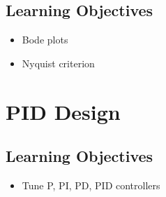 \documentclass[
  letterpaper,
  DIV=11,
  numbers=noendperiod]{scrreprt}
\providecommand{\tightlist}{%
  \setlength{\itemsep}{0pt}\setlength{\parskip}{0pt}}
\begin{document}
\section{Learning Objectives}\label{learning-objectives-3}

\begin{itemize}
\tightlist
\item
  Bode plots
\item
  Nyquist criterion
\end{itemize}


\chapter{PID Design}\label{pid-design}

\section{Learning Objectives}\label{learning-objectives-4}

\begin{itemize}
\tightlist
\item
  Tune P, PI, PD, PID controllers
\end{itemize}
\end{document}
